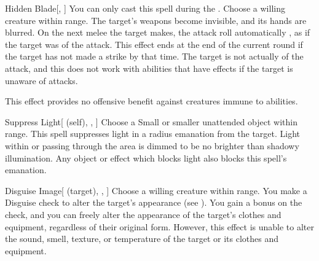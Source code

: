 \lowercase{\hypertarget{spell:Hidden Blade}{}}\label{spell:Hidden Blade}
\begin{apability}[\nth{1}]{\hypertarget{spell:Hidden Blade}{Hidden Blade}}[, ]
You can only cast this spell during the .
Choose a willing creature within \rngclose range.
The target's weapons become invisible, and its hands are blurred.
On the next melee  the target makes,
the attack roll automatically ,
as if the target was  of the attack.
This effect ends at the end of the current round if the target has not made a strike by that time.
The target is not actually  of the attack, and this does not work with abilities that have effects if the target is unaware of attacks.

This effect provides no offensive benefit against creatures immune to  abilities.
\end{apability}
\vspace{0.25em}



\lowercase{\hypertarget{spell:Suppress Light}{}}\label{spell:Suppress Light}
\begin{attuneability}[\nth{1}]{\hypertarget{spell:Suppress Light}{Suppress Light}}[ (self), , ]
Choose a Small or smaller unattended object within \rngclose range.
This spell suppresses light in a \areamed radius emanation from the target.
Light within or passing through the area is dimmed to be no brighter than shadowy illumination.
Any object or effect which blocks light also blocks this spell's emanation.
\end{attuneability}
\vspace{0.25em}



\lowercase{\hypertarget{spell:Disguise Image}{}}\label{spell:Disguise Image}
\begin{attuneability}[\nth{2}]{\hypertarget{spell:Disguise Image}{Disguise Image}}[ (target), , ]
Choose a willing creature within \rngclose range.
You make a Disguise check to alter the target's appearance (see ).
You gain a  bonus on the check, and you can freely alter the appearance of the target's clothes and equipment, regardless of their original form.
However, this effect is unable to alter the sound, smell, texture, or temperature of the target or its clothes and equipment.
\end{attuneability}
\vspace{0.25em}




